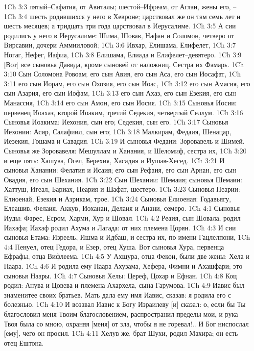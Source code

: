1Ch 3:3  пятый--Сафатия, от Авиталы; шестой--Ифреам, от Аглаи, жены его, --
1Ch 3:4  шесть родившихся у него в Хевроне; царствовал же он там семь лет и шесть месяцев; а тридцать три года царствовал в Иерусалиме.
1Ch 3:5  А сии родились у него в Иерусалиме: Шима, Шовав, Нафан и Соломон, четверо от Вирсавии, дочери Аммииловой;
1Ch 3:6  Ивхар, Елишама, Елифелет,
1Ch 3:7  Ногаг, Нефег, Иафиа,
1Ch 3:8  Елишама, Елиада и Елифелет--девятеро.
1Ch 3:9  [Вот] все сыновья Давида, кроме сыновей от наложниц. Сестра их Фамарь.
1Ch 3:10  Сын Соломона Ровоам; его сын Авия, его сын Аса, его сын Иосафат,
1Ch 3:11  его сын Иорам, его сын Охозия, его сын Иоас,
1Ch 3:12  его сын Амасия, его сын Азария, его сын Иофам,
1Ch 3:13  его сын Ахаз, его сын Езекия, его сын Манассия,
1Ch 3:14  его сын Амон, его сын Иосия.
1Ch 3:15  Сыновья Иосии: первенец Иоахаз, второй Иоаким, третий Седекия, четвертый Селлум.
1Ch 3:16  Сыновья Иоакима: Иехония, сын его; Седекия, сын его.
1Ch 3:17  Сыновья Иехонии: Асир, Салафиил, сын его;
1Ch 3:18  Малкирам, Федаия, Шенацар, Иезекия, Гошама и Савадия.
1Ch 3:19  И сыновья Федаии: Зоровавель и Шимей. Сыновья же Зоровавеля: Мешуллам и Ханания, и Шеломиф, сестра их,
1Ch 3:20  и еще пять: Хашува, Огел, Берехия, Хасадия и Иушав-Хесед.
1Ch 3:21  И сыновья Ханании: Фелатия и Исаия; его сын Рефаия, его сын Арнан, его сын Овадия, его сын Шехания.
1Ch 3:22  Сын Шехании: Шемаия; сыновья Шемаии: Хаттуш, Игеал, Бариах, Неария и Шафат, шестеро.
1Ch 3:23  Сыновья Неарии: Елиоенай, Езекия и Азрикам, трое.
1Ch 3:24  Сыновья Елиоеная: Годавьягу, Елеашив, Фелаия, Аккув, Иоханан, Делаия и Анани, семеро.
1Ch 4:1  Сыновья Иуды: Фарес, Есром, Харми, Хур и Шовал.
1Ch 4:2  Реаия, сын Шовала, родил Иахафа; Иахаф родил Ахума и Лагада: от них племена Цорян.
1Ch 4:3  И сии сыновья Етама: Изреель, Ишма и Идбаш, и сестра их, по имени Гацлелпони,
1Ch 4:4  Пенуел, отец Гедора, и Езер, отец Хуша. Вот сыновья Хура, первенца Ефрафы, отца Вифлеема.
1Ch 4:5  У Ахшура, отца Фекои, были две жены: Хела и Наара.
1Ch 4:6  И родила ему Наара Ахузама, Хефера, Фимни и Ахашфари; это сыновья Наары.
1Ch 4:7  Сыновья Хелы: Цереф, Цохар и Ефнан.
1Ch 4:8  Коц родил: Анува и Цовева и племена Ахархела, сына Гарумова.
1Ch 4:9  Иавис был знаменитее своих братьев. Мать дала ему имя Иавис, сказав: я родила его с болезнью.
1Ch 4:10  И воззвал Иавис к Богу Израилеву [и] сказал: о, если бы Ты благословил меня Твоим благословением, распространил пределы мои, и рука Твоя была со мною, охраняя [меня] от зла, чтобы я не горевал!.. И Бог ниспослал [ему], чего он просил.
1Ch 4:11  Хелув же, брат Шухи, родил Махира; он есть отец Ештона.
